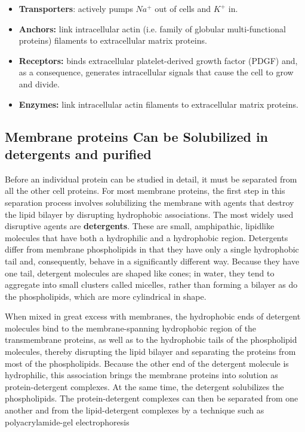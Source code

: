 \begin{itemize}
\item \textbf{Transporters}: actively pumps $Na^{+}$ out of cells and $K^{+}$ in.
\item \textbf{Anchors:} link intracellular actin (i.e. family of globular multi-functional proteins) filaments to extracellular matrix proteins.
\item \textbf{Receptors:} binds extracellular platelet-derived growth factor (PDGF) and, as a consequence, generates intracellular signals
that cause the cell to grow and divide.
\item \textbf{Enzymes:} link intracellular actin filaments to extracellular matrix proteins.
\end{itemize}

\subsection{Membrane proteins Can be Solubilized in detergents and purified}

Before an individual protein can be studied in detail, it must be separated
from all the other cell proteins. For most membrane proteins, the first step
in this separation process involves solubilizing the membrane with agents
that destroy the lipid bilayer by disrupting hydrophobic associations. The
most widely used disruptive agents are \textbf{detergents}. These
are small, amphipathic, lipidlike molecules that have both a hydrophilic
and a hydrophobic region. Detergents differ from membrane
phospholipids in that they have only a single hydrophobic tail and,
consequently, behave in a significantly different way. Because they have
one tail, detergent molecules are shaped like cones; in water, they tend to
aggregate into small clusters called micelles, rather than forming a bilayer
as do the phospholipids, which are more cylindrical in shape.

When mixed in great excess with membranes, the hydrophobic ends of
detergent molecules bind to the membrane-spanning hydrophobic region
of the transmembrane proteins, as well as to the hydrophobic tails of the
phospholipid molecules, thereby disrupting the lipid bilayer and separating
the proteins from most of the phospholipids. Because the other
end of the detergent molecule is hydrophilic, this association brings the
membrane proteins into solution as protein-detergent complexes.
At the same time, the detergent solubilizes the phospholipids. The
protein-detergent complexes can then be separated from one another
and from the lipid-detergent complexes by a technique such as polyacrylamide-gel
electrophoresis

